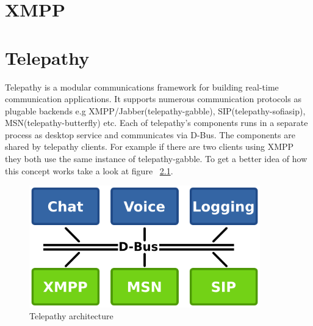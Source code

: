 

\chapter{XMPP}
%


\chapter{Telepathy}
Telepathy is a modular communications framework for building real-time communication applications. It supports numerous communication protocols as plugable backends e.g XMPP/Jabber(telepathy-gabble), SIP(telepathy-sofiasip), MSN(telepathy-butterfly) etc. Each of telepathy's components runs in a separate process as desktop service and communicates via D-Bus. The components are shared by telepathy clients. For example if there are two clients using XMPP they both use the same instance of telepathy-gabble. To get a better idea of how this concept works take a look at figure ~\ref{fig:telepathyArchitecture}.\cite{TPWiki} 

\begin{figure}[ht]
\begin{center}
	\includegraphics[width=10cm]{fig/telepathy-architecture-overview.png}
	\caption{Telepathy architecture\cite{TPWiki}}
	\label{fig:telepathyArchitecture}
\end{center}
\end{figure}



